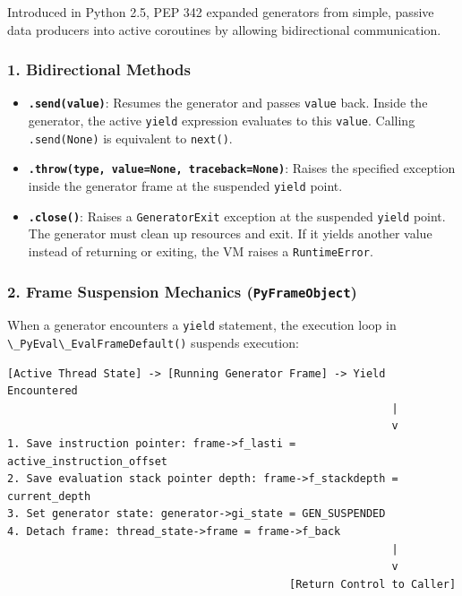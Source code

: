 Introduced in Python 2.5, PEP 342 expanded generators from simple,
passive data producers into active coroutines by allowing bidirectional
communication.

\hypertarget{bidirectional-methods}{%
\subsubsection{1. Bidirectional Methods}\label{bidirectional-methods}}

\begin{itemize}
\tightlist
\item
  \textbf{\passthrough{\lstinline!.send(value)!}}: Resumes the generator
  and passes \passthrough{\lstinline!value!} back. Inside the generator,
  the active \passthrough{\lstinline!yield!} expression evaluates to
  this \passthrough{\lstinline!value!}. Calling
  \passthrough{\lstinline!.send(None)!} is equivalent to
  \passthrough{\lstinline!next()!}.
\item
  \textbf{\passthrough{\lstinline!.throw(type, value=None, traceback=None)!}}:
  Raises the specified exception inside the generator frame at the
  suspended \passthrough{\lstinline!yield!} point.
\item
  \textbf{\passthrough{\lstinline!.close()!}}: Raises a
  \passthrough{\lstinline!GeneratorExit!} exception at the suspended
  \passthrough{\lstinline!yield!} point. The generator must clean up
  resources and exit. If it yields another value instead of returning or
  exiting, the VM raises a \passthrough{\lstinline!RuntimeError!}.
\end{itemize}

\hypertarget{frame-suspension-mechanics-pyframeobject}{%
\subsubsection{\texorpdfstring{2. Frame Suspension Mechanics
(\texttt{PyFrameObject})}{2. Frame Suspension Mechanics (PyFrameObject)}}\label{frame-suspension-mechanics-pyframeobject}}

When a generator encounters a \passthrough{\lstinline!yield!} statement,
the execution loop in
\passthrough{\lstinline!\_PyEval\_EvalFrameDefault()!} suspends
execution:

\begin{lstlisting}
[Active Thread State] -> [Running Generator Frame] -> Yield Encountered
                                                            |
                                                            v
1. Save instruction pointer: frame->f_lasti = active_instruction_offset
2. Save evaluation stack pointer depth: frame->f_stackdepth = current_depth
3. Set generator state: generator->gi_state = GEN_SUSPENDED
4. Detach frame: thread_state->frame = frame->f_back
                                                            |
                                                            v
                                            [Return Control to Caller]
\end{lstlisting}

